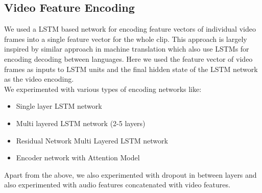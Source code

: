 \documentclass[12pt]{article}
\begin{document}
\subsection{Video Feature Encoding}
	We used a LSTM based network for encoding feature vectors of individual video frames into a single feature vector for the whole clip. This approach is largely inspired by similar approach in machine translation which also use LSTMs for encoding decoding between languages. Here we used the feature
	vector of video frames as inputs to LSTM units and the final hidden state of the LSTM network as the video encoding.\\ 
	We experimented with various types of encoding networks like:
	\begin{itemize}
		\item Single layer LSTM network
		\item Multi layered LSTM network (2-5 layers)
		\item Residual Network Multi Layered LSTM network
		\item Encoder network with Attention Model
	\end{itemize}
	Apart from the above, we also experimented with dropout in between layers and also experimented with audio features concatenated with
	video features.
\end{document}

